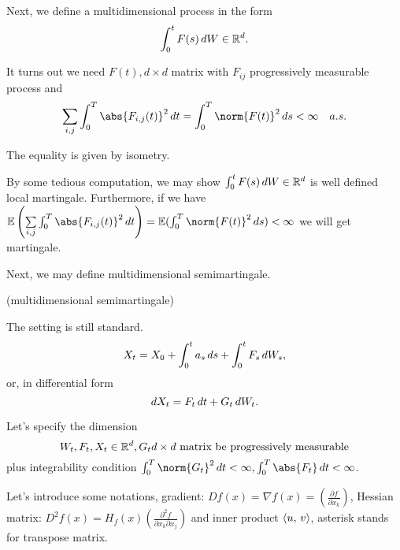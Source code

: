 Next, we define a multidimensional process in the form
\begin{equation*}
    \int_0^t F(s) \mathop{}\!d W \in \mathbb{R}^d.
\end{equation*}

It turns out we need $F(t), d\times d$ matrix with $F_{ij}$ progressively measurable process and 
\begin{equation*}
    \bigs{i,j}\int_0^T \abs{F_{i,j}(t)}^2 \diff t = \int_0^T \norm{F(t)}^2 \diff s <\infty  \quad  a.s.
\end{equation*}

The equality is given by \ito isometry.

By some tedious computation, we may show $\int_0^t F(s) \mathop{}\!d W \in \mathbb{R}^d$ is well defined local martingale. Furthermore, if we have $\E\left(\bigs{i,j}\int_0^T \abs{F_{i,j}(t)}^2 \diff t\right) =\E(\int_0^T \norm{F(t)}^2 \diff s)<\infty$ we will get martingale.

Next, we may define multidimensional semimartingale.
\begin{dfn}{(multidimensional semimartingale)}

The setting is still standard.
\begin{equation*}
    X_t = X_0 + \int_0^t a_s \mathop{}\!d s + \int_0^t F_s \mathop{}\!d W_s,
\end{equation*}
or, in differential form
\begin{equation*}
    \mathop{}\!d X_t =  F_t \mathop{}\!d t + G_t \mathop{}\!d W_t. 
\end{equation*}

Let's specify the dimension 
\begin{equation*}
    W_t, F_t, X_t \in \mathbb{R}^d, G_t d\times d \text{ matrix be progressively measurable}
\end{equation*} plus integrability condition $\int_0^T \norm{G_t}^2 \diff t < \infty, \int_0^T \abs{F_t} \diff t < \infty$.
\end{dfn}

Let's introduce some notations, gradient: $Df(x) = \nabla f(x) = (\frac{\partial f}{\partial x_k})$, Hessian matrix: $D^2 f(x) = H_f(x) (\frac{\partial^2 f}{\partial x_k \partial x_j})$ and inner product $\langle {u},\,{v} \rangle$, asterisk stands for transpose matrix.

